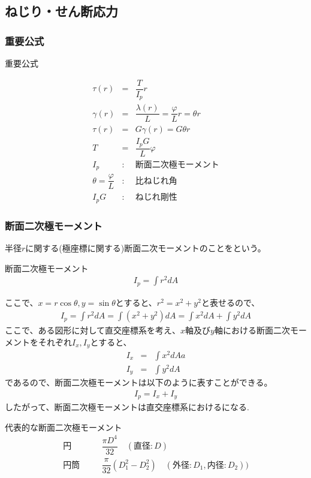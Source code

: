 \documentclass[a4paper]{jsarticle}
\begin{document}
\subsection{ねじり・せん断応力}
\subsubsection{重要公式}
\begin{itembox}[l]{重要公式}
    \begin{center}
        \begin{eqnarray*}
            \tau\left(r\right)&=&\dfrac{T}{I_p} r\\
            \gamma\left(r\right)&=&\dfrac{\lambda\left(r\right)}{L}=\dfrac{\varphi}{L}r=\theta r\\
            \tau\left(r\right)&=&G\gamma\left(r\right)=G\theta r\\
            T&=&\dfrac{I_pG}{L}\varphi\\
            I_p&:&断面二次極モーメント\\
            \theta=\dfrac{\varphi}{L}&:&比ねじれ角\\
            I_pG&:&ねじれ剛性
        \end{eqnarray*}
    \end{center}
\end{itembox}
\subsubsection{断面二次極モーメント}
半径$r$に関する(極座標に関する)断面二次モーメントのことをという。
\begin{itembox}[l]{断面二次極モーメント}
    \begin{eqnarray*}
        \displaystyle I_p=\int r^2dA
    \end{eqnarray*}
\end{itembox}
ここで、$x=r\cos\theta,y=\sin\theta$とすると、$r^2=x^2+y^2$と表せるので、
\begin{eqnarray*}
    \displaystyle I_p=\int r^2dA=\int \left(x^2+y^2\right)dA=\int x^2dA+\int y^2dA
\end{eqnarray*}
ここで、ある図形に対して直交座標系を考え、$x$軸及び$y$軸における断面二次モーメントをそれぞれ$I_x,I_y$とすると、
\begin{eqnarray*}
    \displaystyle
    I_x&=&\int x^2dAa\\
    I_y&=&\int y^2dA
\end{eqnarray*}
であるので、断面二次極モーメントは以下のように表すことができる。
\begin{eqnarray*}
    I_p=I_x+I_y
\end{eqnarray*}
したがって、断面二次極モーメントは直交座標系におけるになる.\\
\begin{itembox}[l]{代表的な断面二次極モーメント}
    \begin{eqnarray*}
        円\qquad&&\dfrac{\pi D^4}{32}\quad(直径:D)\\
        円筒\quad&&\dfrac{\pi}{32}\left(D_1^2-D_2^2\right)\quad(外径:D_1,内径:D_2))\\
    \end{eqnarray*}
\end{itembox}
\end{document}
